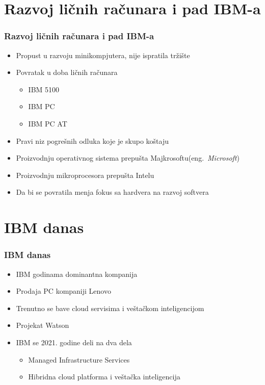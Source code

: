 \documentclass{beamer}
\begin{document}

\section{Razvoj ličnih računara i pad IBM-a}
\begin{frame}[fragile]\frametitle{Razvoj ličnih računara i pad IBM-a}
	\begin{itemize}
	\item Propust u razvoju minikompjutera, nije ispratila tržište
	\item Povratak u doba ličnih računara
	\begin{itemize}
	\item IBM 5100
	\item IBM PC
	\item IBM PC AT
	\end{itemize}
	\item Pravi niz pogrešnih odluka koje je skupo koštaju
	\item Proizvodnju operativnog sistema prepušta Majkrosoftu(eng.~{\em Microsoft})
	\item Proizvodnju mikroprocesora prepušta Intelu
	\item Da bi se povratila menja fokus sa hardvera na razvoj softvera
	\end{itemize}
\end{frame}



\section{IBM danas}

\begin{frame}[fragile]\frametitle{IBM danas}
	\begin{itemize}	
		\item IBM godinama dominantna kompanija
		\item Prodaja PC kompaniji Lenovo 
		\item Trenutno se bave cloud servisima i veštačkom inteligencijom
            \item Projekat Watson
            \item IBM se 2021. godine deli na dva dela
            \begin{itemize}
	       \item Managed Infrastructure Services
	       \item Hibridna cloud platforma i veštačka inteligencija
	    \end{itemize}
            
	\end{itemize}
\end{frame}
\end{document}
